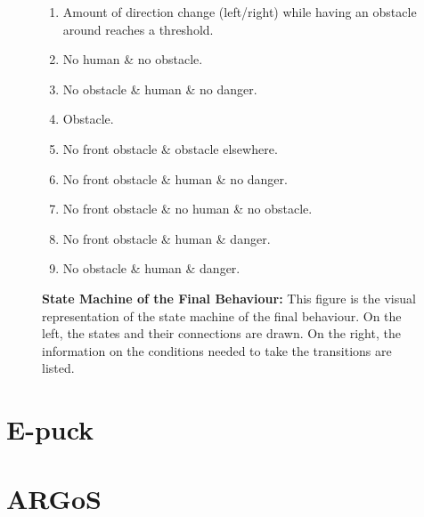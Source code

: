 \documentclass[oneside, a4paper, 12pt]{memoir}
\let\oldCaption\caption
\renewcommand{\caption}[2]{
\oldCaption[#1]{{\small\sffamily\bfseries #1:} #2}
}
\begin{document}
\begin{figure}[!h]
\begin{minipage}[c]{.49\textwidth}
{\begin{tikzpicture}[->, >=stealth', shorten >=1pt, auto, node distance=4cm, semithick]
		\end{tikzpicture}
		}
	\end{minipage}
	\hfill
	\begin{minipage}[c]{.49\textwidth}
		\small\sffamily
		
		\begin{enumerate}
			\item Amount of direction change (left/right) while having an obstacle around reaches a threshold.
			\item No human \& no obstacle.
			\item No obstacle \& human \& no danger.
			\item Obstacle.
			\item No front obstacle \& obstacle elsewhere.
			\item No front obstacle \& human \& no danger.
			\item No front obstacle \& no human \& no obstacle.
			\item No front obstacle \& human \& danger.
			\item No obstacle \& human \& danger.

			\end{enumerate}

	\end{minipage}
	
	\caption{State Machine of the Final Behaviour}{This figure is the visual representation of the state machine of the final behaviour. On the left, the states and their connections are drawn. On the right, the information on the conditions needed to take the transitions are listed.}
	\label{fig:state_machine}
\end{figure}

\chapter{E-puck}

\chapter{ARGoS}
\end{document}
